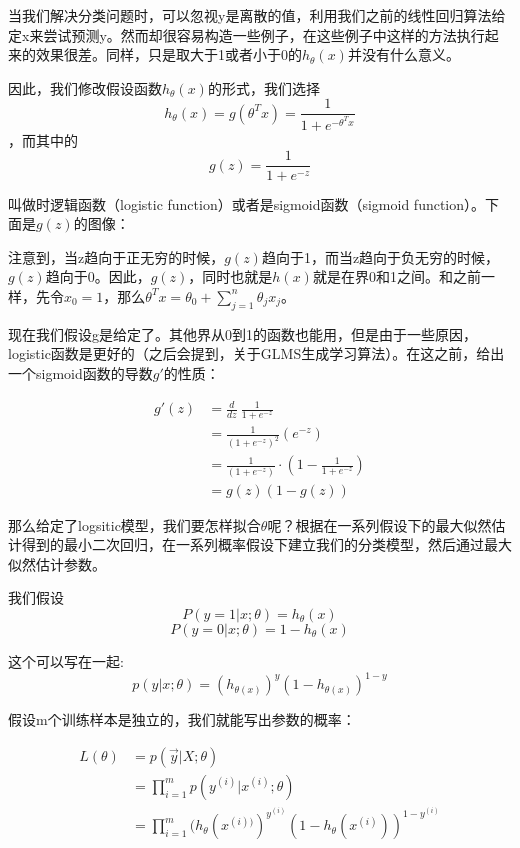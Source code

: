 \documentclass[UTF8]{ctexart}
\begin{document}
当我们解决分类问题时，可以忽视y是离散的值，利用我们之前的线性回归算法给定x来尝试预测y。然而却很容易构造一些例子，在这些例子中这样的方法执行起来的效果很差。同样，只是取大于1或者小于0的$h_{\theta}(x)$并没有什么意义。

因此，我们修改假设函数$h_{\theta}(x)$的形式，我们选择\[ h_{\theta}(x) = g(\theta^{T}x) = \frac{1}{1+e^{-\theta^{T}x}}\] ，而其中的\[ g(z)=\frac{1}{1+e^{-z}} \]

叫做时逻辑函数（logistic function）或者是sigmoid函数（sigmoid function）。下面是$ g(z)$的图像：


\begin{figure}[htb]        
\end{figure}

注意到，当z趋向于正无穷的时候，$ g(z)$趋向于1，而当z趋向于负无穷的时候，$ g(z)$趋向于0。因此，$ g(z)$，同时也就是$ h(x)$就是在界0和1之间。和之前一样，先令$x_{0}=1$，那么$\theta^{T}x=\theta_{0}+\sum_{j=1}^{n}\theta_{j}x_{j}$。

现在我们假设g是给定了。其他界从0到1的函数也能用，但是由于一些原因，logistic函数是更好的（之后会提到，关于GLMS生成学习算法）。在这之前，给出一个sigmoid函数的导数$g'$的性质：


\begin{align*}
g'(z) & = \frac{d}{dz} \ \frac{1}{1+e^{-z}} \\
& = \frac{1}{(1+e^{-z})^{2}} (e^{-z}) \\
& = \frac{1}{(1+e^{-z})} \cdot (1- \frac{1}{1+e^{-z}})\\
& = g(z)(1-g(z))
\end{align*}

那么给定了logsitic模型，我们要怎样拟合$\theta$呢？根据在一系列假设下的最大似然估计得到的最小二次回归，在一系列概率假设下建立我们的分类模型，然后通过最大似然估计参数。

我们假设
\[ P(y=1|x;\theta) = h_{\theta}(x) \]
\[ P(y=0|x;\theta) =1-  h_{\theta}(x) \]

这个可以写在一起:\[ p(y|x;\theta) = (h_{\theta(x)})^{y} (1-h_{\theta(x)})^{1-y} \]


假设m个训练样本是独立的，我们就能写出参数的概率：

\begin{align*}
L(\theta) &  = p(\vec{y}|X;\theta)\\
& = \prod_{i=1}^{m}p(y^{(i)}|x^{(i)};\theta)\\
& = \prod_{i=1}^{m}  (h_{\theta}(x^{(i))})^{y^{(i)}} (1-h_{\theta}(x^{(i)}))^{1-y^{(i)}}
\end{align*}
\end{document}
